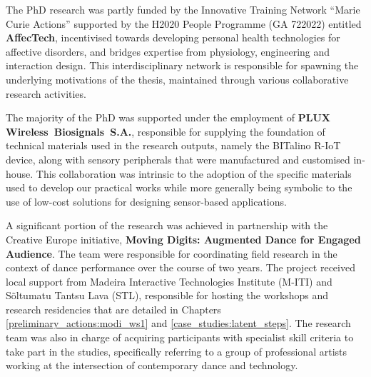 
        The PhD research was partly funded by the Innovative Training Network “Marie Curie Actions” supported by the H2020 People Programme (GA 722022) entitled \textbf{AffecTech}, incentivised towards developing personal health technologies for affective disorders, and bridges expertise from physiology, engineering and interaction design. This interdisciplinary network is responsible for spawning the underlying motivations of the thesis, maintained through various collaborative research activities.


        The majority of the PhD was supported under the employment of \textbf{PLUX Wireless~Biosignals~S.A.}, responsible for supplying the foundation of technical materials used in the research outputs, namely the BITalino R-IoT device, along with sensory peripherals that were manufactured and customised in-house. This collaboration was intrinsic to the adoption of the specific materials used to develop our practical works while more generally being symbolic to the use of low-cost solutions for designing sensor-based applications.


        A significant portion of the research was achieved in partnership with the Creative Europe initiative, \textbf{Moving Digits: Augmented Dance for Engaged Audience}. The team were responsible for coordinating field research in the context of dance performance over the course of two years. The project received local support from Madeira Interactive Technologies Institute (M-ITI) and Sõltumatu Tantsu Lava (STL), responsible for hosting the workshops and research residencies that are detailed in Chapters \ref{preliminary_actions:modi_ws1} and \ref{case_studies:latent_steps}. The research team was also in charge of acquiring participants with specialist skill criteria to take part in the studies, specifically referring to a group of professional artists working at the intersection of contemporary dance and technology.


